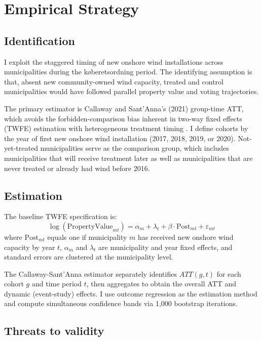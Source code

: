 \documentclass[12pt]{article}
\begin{document}
\section{Empirical Strategy}

\subsection{Identification}

I exploit the staggered timing of new onshore wind installations across municipalities during the k{\o}beretsordning period. The identifying assumption is that, absent new community-owned wind capacity, treated and control municipalities would have followed parallel property value and voting trajectories.

The primary estimator is Callaway and Sant'Anna's (2021) group-time ATT, which avoids the forbidden-comparison bias inherent in two-way fixed effects (TWFE) estimation with heterogeneous treatment timing \citep{GoodmanBacon2021, deChaisemartinDHaultfoeuille2020, SunAbraham2021}. I define cohorts by the year of first new onshore wind installation (2017, 2018, 2019, or 2020). Not-yet-treated municipalities serve as the comparison group, which includes municipalities that will receive treatment later as well as municipalities that are never treated or already had wind before 2016.

\subsection{Estimation}

The baseline TWFE specification is:
\begin{equation}
\log(\text{PropertyValue}_{mt}) = \alpha_m + \lambda_t + \beta \cdot \text{Post}_{mt} + \varepsilon_{mt}
\label{eq:twfe}
\end{equation}
where $\text{Post}_{mt}$ equals one if municipality $m$ has received new onshore wind capacity by year $t$, $\alpha_m$ and $\lambda_t$ are municipality and year fixed effects, and standard errors are clustered at the municipality level.

The Callaway-Sant'Anna estimator separately identifies $ATT(g, t)$ for each cohort $g$ and time period $t$, then aggregates to obtain the overall ATT and dynamic (event-study) effects. I use outcome regression as the estimation method and compute simultaneous confidence bands via 1,000 bootstrap iterations.

\subsection{Threats to validity}
\end{document}
